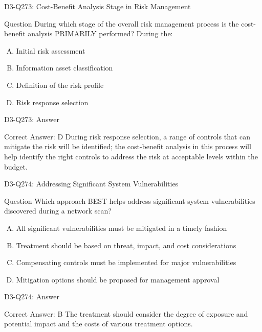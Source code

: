 \documentclass{beamer}
\begin{document}
	\begin{frame}{D3-Q273: Cost-Benefit Analysis Stage in Risk Management}
		\begin{block}{Question}
			During which stage of the overall risk management process is the cost-benefit analysis PRIMARILY performed? During the:
		\end{block}
		\begin{enumerate}[(A)]
			\item Initial risk assessment
			\item Information asset classification
			\item Definition of the risk profile
			\item Risk response selection
		\end{enumerate}
	\end{frame}
	\begin{frame}{D3-Q273: Answer}
		\begin{block}{Correct Answer: D}
			During risk response selection, a range of controls that can mitigate the risk will be identified; the cost-benefit analysis in this process will help identify the right controls to address the risk at acceptable levels within the budget.
		\end{block}
	\end{frame}
	
	\begin{frame}{D3-Q274: Addressing Significant System Vulnerabilities}
		\begin{block}{Question}
			Which approach BEST helps address significant system vulnerabilities discovered during a network scan?
		\end{block}
		\begin{enumerate}[(A)]
			\item All significant vulnerabilities must be mitigated in a timely fashion
			\item Treatment should be based on threat, impact, and cost considerations
			\item Compensating controls must be implemented for major vulnerabilities
			\item Mitigation options should be proposed for management approval
		\end{enumerate}
	\end{frame}
	\begin{frame}{D3-Q274: Answer}
		\begin{block}{Correct Answer: B}
			The treatment should consider the degree of exposure and potential impact and the costs of various treatment options.
		\end{block}
	\end{frame}
	
\end{document}
